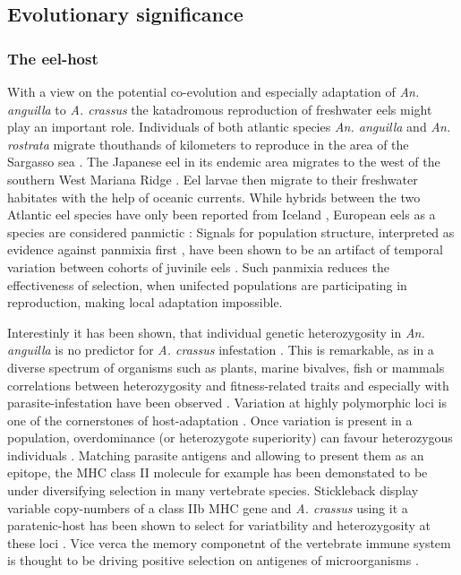\subsection{Evolutionary significance}
\label{ev-sig}

\subsubsection{The eel-host}
\label{sec:eel-host}

With a view on the potential co-evolution and especially adaptation of
\textit{An. anguilla} to \textit{A. crassus} the katadromous
reproduction of freshwater eels might play an important
role. Individuals of both atlantic species \textit{An. anguilla} and
\textit{An. rostrata} migrate thouthands of kilometers to reproduce in
the area of the Sargasso sea \cite{pmid19779192}. The Japanese eel in
its endemic area migrates to the west of the southern West Mariana
Ridge \cite{pmid20735676}. Eel larvae then migrate to their freshwater
habitates with the help of oceanic currents. While hybrids between the
two Atlantic eel species have only been reported from Iceland
\cite{pmid21299662}, European eels as a species are considered
panmictic \cite{pmid20735687}: Signals for population structure,
interpreted as evidence against panmixia first \cite{pmid11234011},
have been shown to be an artifact of temporal variation between
cohorts of juvinile eels \cite{pmid19417764, pmid21299662,
  pmid16024374}. Such panmixia reduces the effectiveness of selection,
when unifected populations are participating in reproduction, making
local adaptation impossible.

Interestinly it has been shown, that individual genetic heterozygosity
in \textit{An. anguilla} is no predictor for \textit{A. crassus}
infestation \cite{pmid19840264}. This is remarkable, as in a diverse
spectrum of organisms such as plants, marine bivalves, fish or mammals
correlations between heterozygosity and fitness-related traits and
especially with parasite-infestation have been observed
\cite{pmid16262866,pmid18398424}. Variation at highly polymorphic loci
is one of the cornerstones of host-adaptation
\cite{pmid20078764}. Once variation is present in a population,
overdominance (or heterozygote superiority) can favour heterozygous
individuals \cite{pmid19129114,pmid17603099}. Matching parasite
antigens and allowing to present them as an epitope, the MHC class II
molecule for example has been demonstated to be under diversifying
selection in many vertebrate species. Stickleback display variable
copy-numbers of a class IIb MHC gene and \textit{A. crassus} using it
a paratenic-host has been shown to select for variatbility and
heterozygosity at these loci \cite{wegner_parasite_2003}. Vice verca
the memory componetnt of the vertebrate immune system is thought to be
driving positive selection on antigenes of microorganisms
\cite{conway_measuring_2002}.

